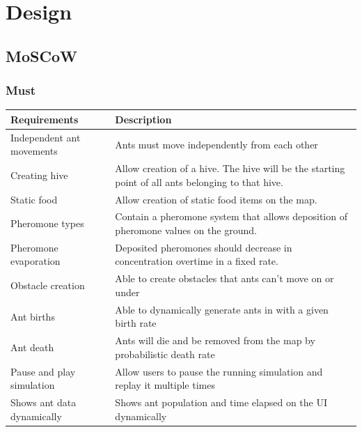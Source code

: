 \documentclass[a4paper, oneside, 11pt]{report}
\begin{document}
\chapter{Design}
\label{chap:design}
\section{MoSCoW}
\subsection{Must}
\begin{tabular}{|| p{3.5cm} | p{10.5cm} ||} 
	\hline
	Requirements & Description \\
	\hline
	Independent ant movements & Ants must move independently from each other \\
	\hline
	Creating hive & Allow creation of a hive. The hive will be the starting point of all ants belonging to that hive. \\
	\hline
	Static food & Allow creation of static food items on the map. \\
	\hline
	Pheromone types & Contain a pheromone system that allows deposition of pheromone values on the ground. \\
	\hline
	Pheromone evaporation & Deposited pheromones should decrease in concentration overtime in a fixed rate. \\
	\hline
	Obstacle creation & Able to create obstacles that ants can't move on or under \\
	\hline
	Ant births & Able to dynamically generate ants in with a given birth rate \\
	\hline
	Ant death & Ants will die and be removed from the map by probabilistic death rate \\
	\hline
	Pause and play simulation & Allow users to pause the running simulation and replay it multiple times \\
	\hline
	Shows ant data dynamically & Shows ant population and time elapsed on the UI dynamically  \\
	\hline
\end{tabular}
\end{document}
